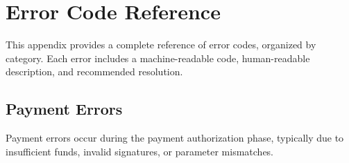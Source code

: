 \chapter{Error Code Reference}
\label{app:errors}

This appendix provides a complete reference of \tprotocol{} error codes, organized by category. Each error includes a machine-readable code, human-readable description, and recommended resolution.

\section{Payment Errors}

Payment errors occur during the payment authorization phase, typically due to insufficient funds, invalid signatures, or parameter mismatches.

